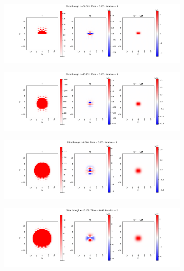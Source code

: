 \documentclass{article}
\begin{document}
\begin{figure}[H]
  \begin{subfigure}[b]{\textwidth}
    \includegraphics[width=\textwidth]{imgs/lf_output2/slice0/mat2.png}
  \end{subfigure}
  \hfill
  \begin{subfigure}[b]{\textwidth}
    \includegraphics[width=\textwidth]{imgs/lf_output2/slice25/mat2.png}
  \end{subfigure}
  \hfill
  \begin{subfigure}[b]{\textwidth}
    \includegraphics[width=\textwidth]{imgs/lf_output2/slice50/mat2.png}
  \end{subfigure}
  \hfill
  \begin{subfigure}[b]{\textwidth}
    \includegraphics[width=\textwidth]{imgs/lf_output2/slice75/mat2.png}
  \end{subfigure}
\end{figure}
\end{document}
